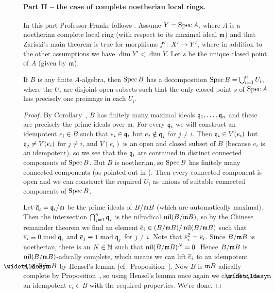 \documentclass[a4paper,parskip=half,numbers=enddot, DIV=12]{scrreprt}
\begin{document}
\paragraph{Part II -- the case of complete noetherian local rings.} In this part Professor Franke follows \cite[Exposé~VIII.6]{sga1}. Assume $Y=\operatorname{Spec} A$, where $A$ is a noetherian complete local ring (with respect to its maximal ideal $\mathfrak{m}$) and that Zariski's main theorem is true for morphisms $f'\colon X'\morphism Y'$, where in addition to the other assumptions we have $\dim Y'<\dim Y$. Let $s$ be the unique closed point of $A$ (given by $\mathfrak{m}$).
\begin{lem}
	If $B$ is any finite $A$-algebra, then $\operatorname{Spec} B$ has a decomposition $\operatorname{Spec} B=\bigcup_{i=1}^nU_i$, where the $U_i$ are disjoint open subsets such that the only closed point $s$ of $\operatorname{Spec} A$ has precisely one preimage in each $U_i$.
\end{lem}
\begin{proof}
	By Corollary~, $B$ has finitely many maximal ideals $\mathfrak{q}_1,\ldots,\mathfrak{q}_n$ and these are precisely the prime ideals over $\mathfrak{m}$. For every $\mathfrak{q}_i$ we will construct an idempotent $e_i\in B$ such that $e_i\in \mathfrak{q}_i$ but $e_i\notin\mathfrak{q}_j$ for $j\neq i$. Then $\mathfrak{q}_i\in V(e_i)$ but $\mathfrak{q}_j\neq V(e_i)$ for $j\neq i$, and $V(e_i)$ is an open and closed subset of $B$ (because $e_i$ is an idempotent), so we see that the $\mathfrak{q}_i$ are contained in distinct connected components of $\operatorname{Spec} B$. But $B$ is noetherian, so $\operatorname{Spec} B$ has finitely many connected components (as pointed out in \cite[Lemma~2.4.2]{alggeo1}). Then every connected component is open and we can construct the required $U_i$ as unions of suitable connected components of $\operatorname{Spec} B$.
	
	Let $\overline{\mathfrak{q}}_i=\mathfrak{q}_i/\mathfrak{m}$ be the prime ideals of $B/\mathfrak{m} B$ (which are automatically maximal). Then the intersection $\bigcap_{j=1}^n\mathfrak{q}_j$ is the nilradical $\operatorname{nil}(B/\mathfrak{m} B)$, so by the Chinese remainder theorem we find an element $\overline{e}_i\in (B/\mathfrak{m} B)/\operatorname{nil}(B/\mathfrak{m} B)$ such that $\overline{e}_i\equiv 0\bmod \overline{\mathfrak{q}}_i$ and $\overline{e}_j\equiv 1\bmod\overline{\mathfrak{q}}_j$ for $j\neq i$. Note that $\overline{e}_i^2=\overline{e}_i$. Since $B/\mathfrak{m} B$ is noetherian, there is an $N\in\mathbb{N}$ such that $\operatorname{nil}(B/\mathfrak{m} B)^N=0$. Hence $B/\mathfrak{m} B$ is $\operatorname{nil}(B/\mathfrak{m} B)$-adically complete, which means we can lift $\overline{e}_i$ to an idempotent $\snake{e}_i\in B/\mm B$ by Hensel's lemma (cf.\ Proposition~). Now $B$ is $\mathfrak{m} B$-adically complete by Proposition~, so using Hensel's lemma once again we can lift $\snake{e}_i$ to an idempotent $e_i\in B$ with the required properties. We're done.
\end{proof}
\end{document}
